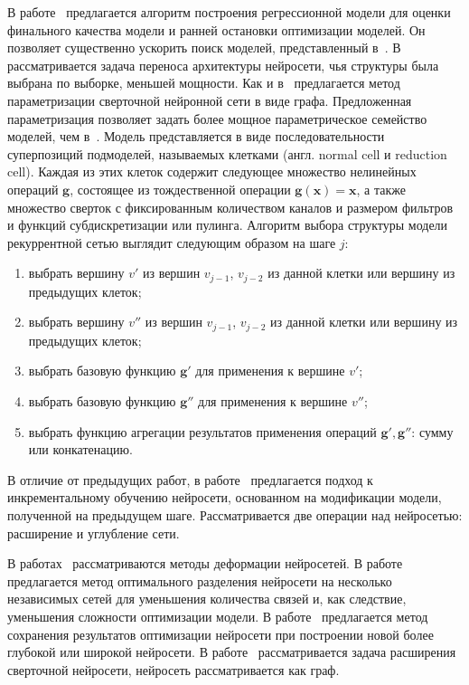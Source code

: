В работе~\cite{reinf_predict} предлагается алгоритм построения регрессионной модели для оценки финального качества модели и ранней остановки оптимизации моделей. Он позволяет существенно ускорить поиск моделей, представленный в~\cite{reinf}.
В~\cite{reinf_transfer} рассматривается задача переноса архитектуры нейросети, чья структуры была выбрана по выборке, меньшей мощности. Как и в~\cite{reinf} предлагается метод параметризации сверточной нейронной сети в виде графа. Предложенная параметризация позволяет задать более мощное параметрическое семейство моделей, чем в~\cite{reinf}. Модель представляется в виде последовательности суперпозиций подмоделей, называемых клетками (англ. normal cell и reduction cell). Каждая из этих клеток содержит следующее множество нелинейных операций $\mathbf{g}$, состоящее из тождественной операции $\mathbf{g}(\mathbf{x}) = \mathbf{x}$, а также множество сверток с фиксированным количеством каналов и размером фильтров и функций субдискретизации или пулинга.
Алгоритм выбора структуры модели рекуррентной сетью выглядит следующим образом на шаге $j$:
\begin{enumerate}[1)]
\item выбрать вершину $v'$ из вершин $v_{j-1}$, $v_{j-2}$ из данной клетки или вершину из предыдущих клеток;
\item выбрать вершину $v''$ из вершин $v_{j-1}$, $v_{j-2}$ из данной клетки или вершину из предыдущих клеток;
\item выбрать базовую функцию $\mathbf{g}'$ для применения к вершине $v'$;
\item выбрать базовую функцию $\mathbf{g}''$ для применения к вершине $v''$;
\item выбрать функцию агрегации результатов применения операций $\mathbf{g}',\mathbf{g}''$: сумму или конкатенацию.
\end{enumerate}


В отличие от предыдущих работ, в работе~\cite{reinf_deep2net} предлагается подход к инкрементальному обучению нейросети, основанном на модификации модели, полученной на предыдущем шаге. Рассматривается две операции над нейросетью: расширение и углубление сети.

В работах~\cite{net2net, morph, partition} рассматриваются методы деформации нейросетей. 
В работе~\cite{partition} предлагается метод оптимального разделения нейросети на несколько независимых сетей для уменьшения количества связей и, как следствие, уменьшения сложности оптимизации модели. В работе~\cite{net2net} предлагается метод сохранения результатов оптимизации нейросети при построении новой более глубокой или широкой нейросети. 
В работе~\cite{morph} рассматривается задача расширения сверточной нейросети, нейросеть рассматривается как граф.

